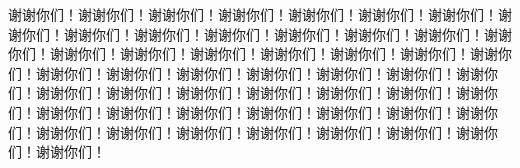 
\backmatter  %


\begin{thankpage}

  谢谢你们！谢谢你们！谢谢你们！谢谢你们！谢谢你们！谢谢你们！谢谢你们！谢谢你们！谢谢你们！谢谢你们！谢谢你们！谢谢你们！谢谢你们！谢谢你们！谢谢你们！谢谢你们！谢谢你们！谢谢你们！谢谢你们！谢谢你们！谢谢你们！谢谢你们！谢谢你们！谢谢你们！谢谢你们！谢谢你们！谢谢你们！谢谢你们！谢谢你们！谢谢你们！谢谢你们！谢谢你们！谢谢你们！谢谢你们！谢谢你们！谢谢你们！谢谢你们！谢谢你们！谢谢你们！谢谢你们！谢谢你们！谢谢你们！谢谢你们！谢谢你们！谢谢你们！谢谢你们！谢谢你们！谢谢你们！谢谢你们！谢谢你们！谢谢你们！



\end{thankpage}
